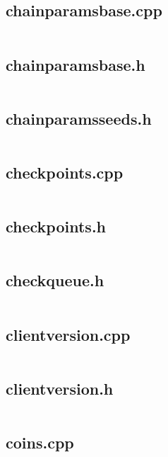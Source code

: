 \documentclass{article}
\begin{document}
\subsection{chainparamsbase.cpp}
\inputminted{cpp}{/home/dufferzafar/dev/@clones/bitcoin/src/chainparamsbase.cpp}
\newpage

\subsection{chainparamsbase.h}
\inputminted{cpp}{/home/dufferzafar/dev/@clones/bitcoin/src/chainparamsbase.h}
\newpage

\subsection{chainparamsseeds.h}
\inputminted{cpp}{/home/dufferzafar/dev/@clones/bitcoin/src/chainparamsseeds.h}
\newpage

\subsection{checkpoints.cpp}
\inputminted{cpp}{/home/dufferzafar/dev/@clones/bitcoin/src/checkpoints.cpp}
\newpage

\subsection{checkpoints.h}
\inputminted{cpp}{/home/dufferzafar/dev/@clones/bitcoin/src/checkpoints.h}
\newpage

\subsection{checkqueue.h}
\inputminted{cpp}{/home/dufferzafar/dev/@clones/bitcoin/src/checkqueue.h}
\newpage

\subsection{clientversion.cpp}
\inputminted{cpp}{/home/dufferzafar/dev/@clones/bitcoin/src/clientversion.cpp}
\newpage

\subsection{clientversion.h}
\inputminted{cpp}{/home/dufferzafar/dev/@clones/bitcoin/src/clientversion.h}
\newpage

\subsection{coins.cpp}
\inputminted{cpp}{/home/dufferzafar/dev/@clones/bitcoin/src/coins.cpp}
\newpage
\end{document}
